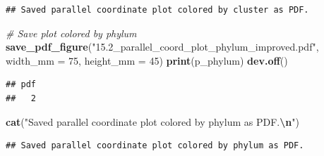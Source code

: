 \documentclass[
]{article}
\newenvironment{Shaded}{\begin{snugshade}}{\end{snugshade}}
\newcommand{\AttributeTok}[1]{\textcolor[rgb]{0.13,0.29,0.53}{#1}}
\newcommand{\CommentTok}[1]{\textcolor[rgb]{0.56,0.35,0.01}{\textit{#1}}}
\newcommand{\DecValTok}[1]{\textcolor[rgb]{0.00,0.00,0.81}{#1}}
\newcommand{\FunctionTok}[1]{\textcolor[rgb]{0.13,0.29,0.53}{\textbf{#1}}}
\newcommand{\NormalTok}[1]{#1}
\newcommand{\SpecialCharTok}[1]{\textcolor[rgb]{0.81,0.36,0.00}{\textbf{#1}}}
\newcommand{\StringTok}[1]{\textcolor[rgb]{0.31,0.60,0.02}{#1}}
\begin{document}
\begin{verbatim}
## Saved parallel coordinate plot colored by cluster as PDF.
\end{verbatim}

\begin{Shaded}
\begin{Highlighting}[]
\CommentTok{\# Save plot colored by phylum}
\FunctionTok{save\_pdf\_figure}\NormalTok{(}\StringTok{"15.2\_parallel\_coord\_plot\_phylum\_improved.pdf"}\NormalTok{, }\AttributeTok{width\_mm =} \DecValTok{75}\NormalTok{, }\AttributeTok{height\_mm =} \DecValTok{45}\NormalTok{)}
\FunctionTok{print}\NormalTok{(p\_phylum)}
\FunctionTok{dev.off}\NormalTok{()}
\end{Highlighting}
\end{Shaded}

\begin{verbatim}
## pdf 
##   2
\end{verbatim}

\begin{Shaded}
\begin{Highlighting}[]
\FunctionTok{cat}\NormalTok{(}\StringTok{"Saved parallel coordinate plot colored by phylum as PDF.}\SpecialCharTok{\textbackslash{}n}\StringTok{"}\NormalTok{)}
\end{Highlighting}
\end{Shaded}

\begin{verbatim}
## Saved parallel coordinate plot colored by phylum as PDF.
\end{verbatim}
\end{document}
